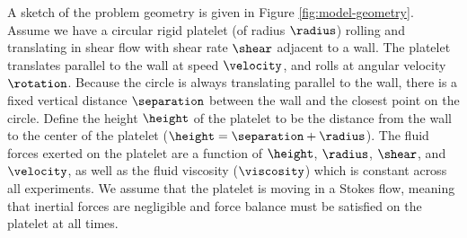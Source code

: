 A sketch of the problem geometry is given in Figure
\ref{fig:model-geometry}. Assume we have a circular rigid platelet (of
radius $\radius$) rolling and translating in shear flow with shear
rate $\shear$ adjacent to a wall. The platelet translates parallel to
the wall at speed $\velocity$, and rolls at angular velocity
$\rotation$. Because the circle is always translating parallel to the
wall, there is a fixed vertical distance $\separation$ between the
wall and the closest point on the circle. Define the height $\height$
of the platelet to be the distance from the wall to the center of the
platelet ($\height = \separation + \radius$). The fluid forces exerted
on the platelet are a function of $\height$, $\radius$, $\shear$, and
$\velocity$, as well as the fluid viscosity ($\viscosity$) which is
constant across all experiments. We assume that the platelet is moving
in a Stokes flow, meaning that inertial forces are negligible and
force balance must be satisfied on the platelet at all times.

